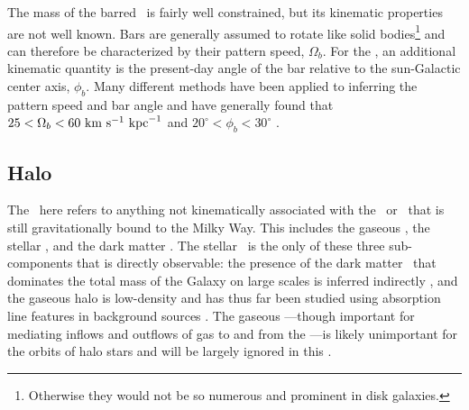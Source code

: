 The mass of the barred \mwbulge\ is fairly well constrained, but its kinematic
properties are not well known. Bars are generally assumed to rotate like solid
bodies\footnote{Otherwise they would not be so numerous and prominent in disk
galaxies.} and can therefore be characterized by their pattern speed,
$\Omega_b$. For the \mwbulge, an additional kinematic quantity is the
present-day angle of the bar relative to the sun-Galactic center axis, $\phi_b$.
Many different methods have been applied to inferring the pattern speed and bar
angle and have generally found that $25 < \Omega_b < 60~\mathrm{km}~\mathrm{s}^{-1}~\mathrm{kpc}^{-1}$ and $20^\circ <
\phi_b < 30^\circ$ \citep[but individual measurements are generally inconsistent
in that they are separated by values much larger than their estimated
uncertainties;][]{dwek95, stanek97, debattista02, shen10, wegg13, cao13, wegg15,
portail15}.



\subsection{Halo} \label{sec:mw-halo}

The \mwhalo\ here refers to anything not kinematically associated with the
\mwdisk\ or \mwbulge\ that is still gravitationally bound to the Milky Way. This
includes the gaseous \mwhalo, the stellar \mwhalo, and the dark matter \mwhalo.
The stellar \mwhalo\ is the only of these three sub-components that is directly
observable: the presence of the dark matter \mwhalo\ that dominates the total
mass of the Galaxy on large scales is inferred indirectly
\citep[e.g.,][]{vandermarel12b}, and the gaseous halo is low-density and has
thus far been studied using absorption line features in background sources
\citep{miller13}. The gaseous \mwhalo---though important for mediating inflows
and outflows of gas to and from the \mwdisk---is likely unimportant for the
orbits of halo stars and will be largely ignored in this \article. %

